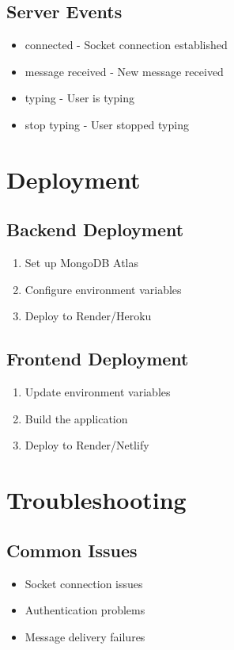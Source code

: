 \documentclass[12pt,a4paper]{article}
\begin{document}
\subsection{Server Events}
\begin{itemize}
    \item connected - Socket connection established
    \item message received - New message received
    \item typing - User is typing
    \item stop typing - User stopped typing
\end{itemize}

\section{Deployment}
\subsection{Backend Deployment}
\begin{enumerate}
    \item Set up MongoDB Atlas
    \item Configure environment variables
    \item Deploy to Render/Heroku
\end{enumerate}

\subsection{Frontend Deployment}
\begin{enumerate}
    \item Update environment variables
    \item Build the application
    \item Deploy to Render/Netlify
\end{enumerate}

\section{Troubleshooting}
\subsection{Common Issues}
\begin{itemize}
    \item Socket connection issues
    \item Authentication problems
    \item Message delivery failures
\end{itemize}
\end{document}
